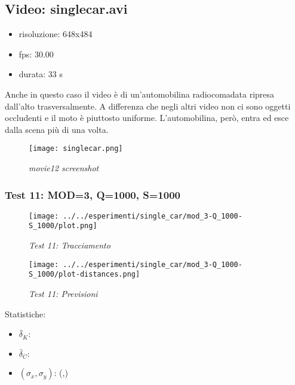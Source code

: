 \newpage
\subsection{Video: singlecar.avi}

\begin{itemize}
\item risoluzione: 648x484
\item fps: 30.00
\item durata: 33 s
\end{itemize}

Anche in questo caso il video è di un'automobilina radiocomadata ripresa dall'alto trasversalmente. A differenza che negli altri video non ci sono oggetti occludenti e il moto è piuttosto uniforme. L'automobilina, però, entra ed esce dalla scena più di una volta.

\begin{figure}[hb]
\centering
	\texttt{[image: singlecar.png]}
\caption{\textit{movie12 screenshot}}
\end{figure}

\newpage
\subsubsection{Test 11: MOD=3, Q=1000, S=1000}

\begin{figure}[hb]
\centering
\texttt{[image: ../../esperimenti/single\_car/mod\_3-Q\_1000-S\_1000/plot.png]}
\caption{\textit{Test 11: Tracciamento}}
\end{figure}

\begin{figure}[hb]
\centering
\texttt{[image: ../../esperimenti/single\_car/mod\_3-Q\_1000-S\_1000/plot-distances.png]}
\caption{\textit{Test 11: Previsioni}}
\end{figure}

Statistiche:
\begin{itemize}
\item \begin{math} \bar \delta_K:  \end{math}
\item \begin{math} \bar \delta_C:  \end{math}
\item \begin{math}(\sigma_x,\sigma_y)\end{math}: (,)
\end{itemize}

